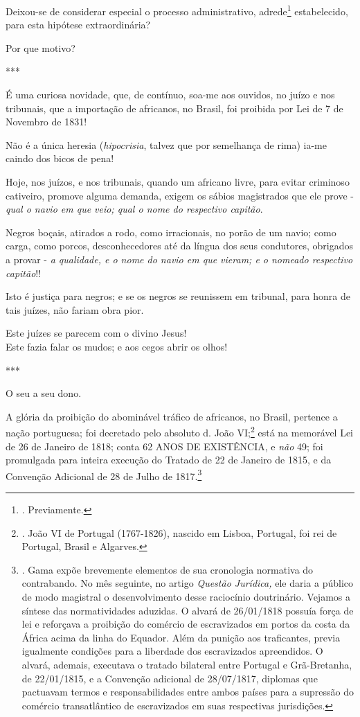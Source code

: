 Deixou-se de considerar especial o processo administrativo,
adrede\footnote{. Previamente.} estabelecido, para esta hipótese
extraordinária?

Por que motivo?

***

É uma curiosa novidade, que, de contínuo, soa-me aos ouvidos, no juízo e
nos tribunais, que a importação de africanos, no Brasil, foi proibida
por Lei de 7 de Novembro de 1831!

Não é a única heresia (\emph{hipocrisia}, talvez que por semelhança de
rima) ia-me caindo dos bicos de pena!

Hoje, nos juízos, e nos tribunais, quando um africano livre, para evitar
criminoso cativeiro, promove alguma demanda, exigem os sábios
magistrados que ele prove - \emph{qual o navio em que veio; qual o nome
do respectivo capitão}.

Negros boçais, atirados a rodo, como irracionais, no porão de um navio;
como carga, como porcos, desconhecedores até da língua dos seus
condutores, obrigados a provar - \emph{a qualidade, e o nome do navio em
que vieram; e o nomeado respectivo capitão}!!

Isto é justiça para negros; e se os negros se reunissem em tribunal,
para honra de tais juízes, não fariam obra pior.

Este juízes se parecem com o divino Jesus!\\
Este fazia falar os mudos; e aos cegos abrir os olhos!

***

O seu a seu dono.

A glória da proibição do abominável tráfico de africanos, no Brasil,
pertence a nação portuguesa; foi decretado pelo absoluto d. João
VI;\footnote{. João VI de Portugal (1767-1826), nascido em Lisboa,
  Portugal, foi rei de Portugal, Brasil e Algarves.} está na memorável
Lei de 26 de Janeiro de 1818; conta 62 ANOS DE EXISTÊNCIA, e \emph{não}
49; foi promulgada para inteira execução do Tratado de 22 de Janeiro de
1815, e da Convenção Adicional de 28 de Julho de 1817.\footnote{. Gama
  expõe brevemente elementos de sua cronologia normativa do contrabando.
  No mês seguinte, no artigo \emph{Questão Jurídica,} ele daria a
  público de modo magistral o desenvolvimento desse raciocínio
  doutrinário. Vejamos a síntese das normatividades aduzidas. O alvará
  de 26/01/1818 possuía força de lei e reforçava a proibição do comércio
  de escravizados em portos da costa da África acima da linha do
  Equador. Além da punição aos traficantes, previa igualmente condições
  para a liberdade dos escravizados apreendidos. O alvará, ademais,
  executava o tratado bilateral entre Portugal e Grã-Bretanha, de
  22/01/1815, e a Convenção adicional de 28/07/1817, diplomas que
  pactuavam termos e responsabilidades entre ambos países para a
  supressão do comércio transatlântico de escravizados em suas
  respectivas jurisdições.}


